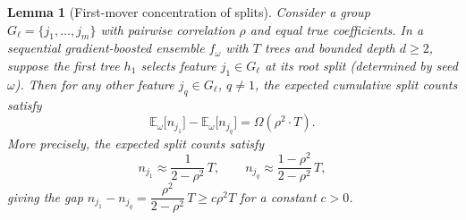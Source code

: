 \documentclass[11pt]{article}
\newtheorem{lemma}[theorem]{Lemma}
\theoremstyle{remark}
\newcommand{\Gl}{G_\ell}                    %
\newcommand{\splits}[1]{n_{#1}}             %
\newcommand{\totalT}{T}                     %
\newcommand{\rhovar}{\rho}                  %
\newcommand{\Exp}{\mathbb{E}}              %
\begin{document}
\begin{lemma}[First-mover concentration of splits]
\label{lem:split-concentration}
Consider a group $\Gl = \{j_1, \dots, j_m\}$ with pairwise correlation
$\rhovar$ and equal true coefficients.  In a sequential gradient-boosted
ensemble $f_\omega$ with $\totalT$ trees and bounded depth $d \geq 2$,
suppose the first tree $h_1$ selects feature $j_1 \in \Gl$ at its root
split (determined by seed $\omega$).  Then for any other feature
$j_q \in \Gl$, $q \neq 1$, the expected cumulative split counts satisfy
\begin{equation}
  \Exp_\omega\bigl[\splits{j_1}\bigr]
    - \Exp_\omega\bigl[\splits{j_q}\bigr]
    = \Omega(\rhovar^2 \cdot \totalT).
  \label{eq:split-gap}
\end{equation}
More precisely, the expected split counts satisfy
\begin{equation}
  n_{j_1} \approx \frac{1}{2-\rho^2}\,T,\qquad
  n_{j_q} \approx \frac{1-\rho^2}{2-\rho^2}\,T,
  \label{eq:split-counts}
\end{equation}
giving the gap $n_{j_1} - n_{j_q} = \dfrac{\rho^2}{2-\rho^2}\,T \geq c\rho^2 T$
for a constant $c > 0$.
\end{lemma}
\end{document}
